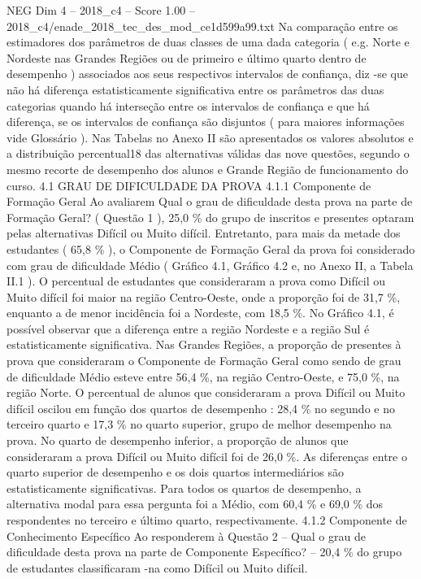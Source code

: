 \begin{textsample}{NEG Dim 4 – 2018\_c4 – Score 1.00 – 2018\_c4/enade\_2018\_tec\_des\_mod\_ce1d599a99.txt}
Na comparação entre os estimadores dos parâmetros de duas classes de uma dada categoria ( e.g.
Norte e Nordeste nas Grandes Regiões ou de primeiro e último quarto dentro de desempenho ) associados aos seus respectivos intervalos de confiança, diz -se que não há diferença estatisticamente significativa entre os parâmetros das duas categorias quando há interseção entre os intervalos de confiança e que há diferença, se os intervalos de confiança são disjuntos ( para maiores informações vide Glossário ).
Nas Tabelas no Anexo II são apresentados os valores absolutos e a distribuição percentual18 das alternativas válidas das nove questões, segundo o mesmo recorte de desempenho dos alunos e Grande Região de funcionamento do curso. 4.1 GRAU DE DIFICULDADE DA PROVA 4.1.1 Componente de Formação Geral Ao avaliarem Qual o grau de dificuldade desta prova na parte de Formação Geral? ( Questão 1 ), 25,0 \% do grupo de inscritos e presentes optaram pelas alternativas Difícil ou Muito difícil.
Entretanto, para mais da metade dos estudantes ( 65,8 \% ), o Componente de Formação Geral da prova foi considerado com grau de dificuldade Médio ( Gráfico 4.1, Gráfico 4.2 e, no Anexo II, a Tabela II.1 ).
O percentual de estudantes que consideraram a prova como Difícil ou Muito difícil foi maior na região Centro-Oeste, onde a proporção foi de 31,7 \%, enquanto a de menor incidência foi a Nordeste, com 18,5 \%.
No Gráfico 4.1, é possível observar que a diferença entre a região Nordeste e a região Sul é estatisticamente significativa.
Nas Grandes Regiões, a proporção de presentes à prova que consideraram o Componente de Formação Geral como sendo de grau de dificuldade Médio esteve entre 56,4 \%, na região Centro-Oeste, e 75,0 \%, na região Norte.
O percentual de alunos que consideraram a prova Difícil ou Muito difícil oscilou em função dos quartos de desempenho : 28,4 \% no segundo e no terceiro quarto e 17,3 \% no quarto superior, grupo de melhor desempenho na prova.
No quarto de desempenho inferior, a proporção de alunos que consideraram a prova Difícil ou Muito difícil foi de 26,0 \%.
As diferenças entre o quarto superior de desempenho e os dois quartos intermediários são estatisticamente significativas.
Para todos os quartos de desempenho, a alternativa modal para essa pergunta foi a Médio, com 60,4 \% e 69,0 \% dos respondentes no terceiro e último quarto, respectivamente. 4.1.2 Componente de Conhecimento Específico Ao responderem à Questão 2 – Qual o grau de dificuldade desta prova na parte de Componente Específico? – 20,4 \% do grupo de estudantes classificaram -na como Difícil ou Muito difícil.

\end{textsample}
